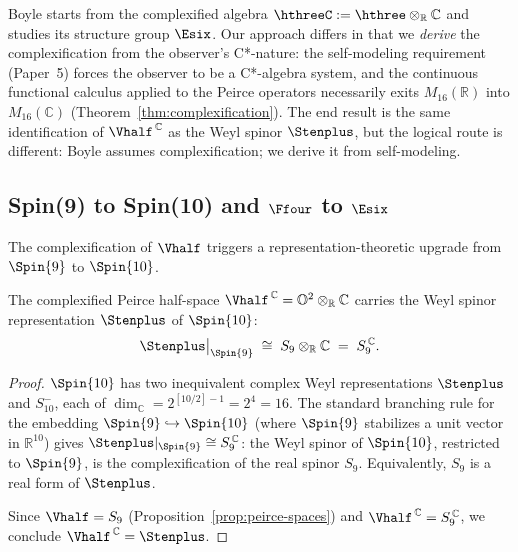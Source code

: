 \begin{remark}\label{rem:boyle-contrast}
Boyle starts from the complexified algebra
$\hthreeC := \hthree\otimes_\mathbb{R}\mathbb{C}$ and
studies its structure group $\Esix$.  Our approach differs in that
we \emph{derive} the complexification from the observer's C*-nature:
the self-modeling requirement (Paper~5) forces the observer to be a
C*-algebra system, and the continuous functional calculus applied to the Peirce operators
necessarily exits $M_{16}(\mathbb{R})$ into $M_{16}(\mathbb{C})$
(Theorem~\ref{thm:complexification}).  The end result is the same
identification of $\Vhalf^{\,\mathbb{C}}$ as the Weyl spinor
$\Stenplus$, but the logical route is different: Boyle assumes
complexification; we derive it from self-modeling.
\end{remark}

\subsection{Spin(9) to Spin(10) and \texorpdfstring{$\Ffour$}{F4} to \texorpdfstring{$\Esix$}{E6}}\label{sec:spin-upgrade}

The complexification of $\Vhalf$ triggers a representation-theoretic
upgrade from $\Spin{9}$ to $\Spin{10}$.

\begin{proposition}\label{prop:spinor-upgrade}
The complexified Peirce half-space
$\Vhalf^{\,\mathbb{C}} = \mathbb{O}^2\otimes_\mathbb{R}\mathbb{C}$
carries the Weyl spinor representation $\Stenplus$ of $\Spin{10}$:
\begin{equation}\label{eq:branching}
  \Stenplus\big|_{\Spin{9}}
  \;\cong\;
  S_9 \otimes_\mathbb{R} \mathbb{C}
  \;=\;
  S_9^{\,\mathbb{C}}.
\end{equation}
\end{proposition}

\begin{proof}
$\Spin{10}$ has two inequivalent complex Weyl representations
$\Stenplus$ and $S_{10}^-$, each of
$\dim_\mathbb{C} = 2^{[10/2]-1} = 2^4 = 16$.
The standard branching rule for the embedding
$\Spin{9}\hookrightarrow\Spin{10}$ (where $\Spin{9}$ stabilizes a
unit vector in $\mathbb{R}^{10}$) gives
$\Stenplus|_{\Spin{9}} \cong S_9^{\,\mathbb{C}}$:
the Weyl spinor of $\Spin{10}$, restricted to $\Spin{9}$, is
the complexification of the real spinor $S_9$.  Equivalently,
$S_9$ is a real form of $\Stenplus$.

Since $\Vhalf = S_9$ (Proposition~\ref{prop:peirce-spaces}) and
$\Vhalf^{\,\mathbb{C}} = S_9^{\,\mathbb{C}}$, we conclude
$\Vhalf^{\,\mathbb{C}} = \Stenplus$.
\end{proof}

